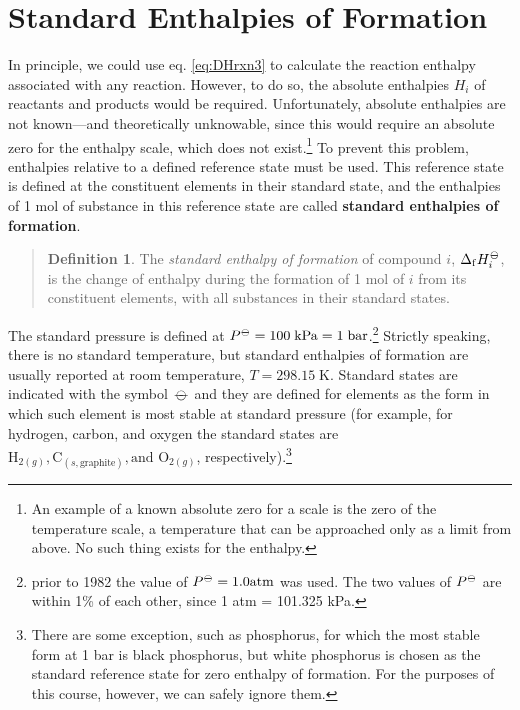 \documentclass[
  9pt,
]{extbook}
\theoremstyle{definition}
\newtheorem{definition}{Definition}[chapter]
\theoremstyle{definition}
\theoremstyle{definition}
\theoremstyle{remark}
\begin{document}
\hypertarget{formenthalpy}{%
\section{Standard Enthalpies of Formation}\label{formenthalpy}}

In principle, we could use eq. \eqref{eq:DHrxn3} to calculate the reaction enthalpy associated with any reaction. However, to do so, the absolute enthalpies \(H_i\) of reactants and products would be required. Unfortunately, absolute enthalpies are not known---and theoretically unknowable, since this would require an absolute zero for the enthalpy scale, which does not exist.\footnote{An example of a known absolute zero for a scale is the zero of the temperature scale, a temperature that can be approached only as a limit from above. No such thing exists for the enthalpy.} To prevent this problem, enthalpies relative to a deﬁned reference state must be used. This reference state is defined at the constituent elements in their standard state, and the enthalpies of 1 mol of substance in this reference state are called \textbf{standard enthalpies of formation}.

\begin{quote}
\begin{definition}
\protect\hypertarget{def:stdenthapies}{}{\label{def:stdenthapies} }
The \emph{standard enthalpy of formation} of compound \(i\), \(\Delta_{\mathrm{f}} H_i^{-\kern-6pt{\ominus}\kern-6pt-}\), is the change of enthalpy during the formation of 1 mol of \(i\) from its constituent elements, with all substances in their standard states.
\end{definition}
\end{quote}

The standard pressure is defined at \(P^{{-\kern-6pt{\ominus}\kern-6pt-}} = 100 \; \mathrm{kPa} = 1 \; \mathrm{bar}\).\footnote{prior to 1982 the value of \(P^{{-\kern-6pt{\ominus}\kern-6pt-}} = 1.0 \mathrm{ atm}\) was used. The two values of \(P^{-\kern-6pt{\ominus}\kern-6pt-}\) are within 1\% of each other, since 1 atm = 101.325 kPa.} Strictly speaking, there is no standard temperature, but standard enthalpies of formation are usually reported at room temperature, \(T = 298.15 \; \mathrm{K}\). Standard states are indicated with the symbol \({-\kern-6pt{\ominus}\kern-6pt-}\) and they are defined for elements as the form in which such element is most stable at standard pressure (for example, for hydrogen, carbon, and oxygen the standard states are \(\mathrm{H}_{2(g)}, \mathrm{C}_{(s,\text{graphite})}, \text{and }\mathrm{O}_{2(g)}\), respectively).\footnote{There are some exception, such as phosphorus, for which the most stable form at 1 bar is black phosphorus, but white phosphorus is chosen as the standard reference state for zero enthalpy of formation. For the purposes of this course, however, we can safely ignore them.}
\end{document}
